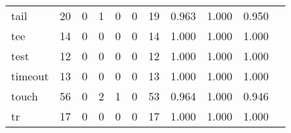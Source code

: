 \begin{longtable}{lp{1.20cm}p{1.20cm}p{1.20cm}p{1.20cm}p{1.20cm}p{1.20cm}p{1.20cm}p{1.20cm}p{1.20cm}p{1.20cm}}
tail      &                                    20 &                                                  0 &                                                  1 &                                                  0 &                                                  0 &                                                 19 &                                         0.963 &                                              1.000 &                                              0.950 \\
tee       &                                    14 &                                                  0 &                                                  0 &                                                  0 &                                                  0 &                                                 14 &                                         1.000 &                                              1.000 &                                              1.000 \\
test      &                                    12 &                                                  0 &                                                  0 &                                                  0 &                                                  0 &                                                 12 &                                         1.000 &                                              1.000 &                                              1.000 \\
timeout   &                                    13 &                                                  0 &                                                  0 &                                                  0 &                                                  0 &                                                 13 &                                         1.000 &                                              1.000 &                                              1.000 \\
touch     &                                    56 &                                                  0 &                                                  2 &                                                  1 &                                                  0 &                                                 53 &                                         0.964 &                                              1.000 &                                              0.946 \\
tr        &                                    17 &                                                  0 &                                                  0 &                                                  0 &                                                  0 &                                                 17 &                                         1.000 &                                              1.000 &                                              1.000 \\

\end{longtable}
